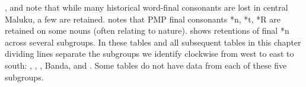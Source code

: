 \citet{Stresemann1927}, \citet{Collins1981,Collins1983}
and \citet{Blust1981} note that while many historical word-final
consonants are lost in central Maluku,
a few are retained.
\citet{Grimes2024} notes that PMP final consonants *n,
*t, *R are retained on some nouns (often relating to nature).
 shows retentions of final *n across several subgroups.
In these tables
and all subsequent tables in this chapter dividing lines separate
the subgroups we identify clockwise from west to east to south:
, , , Banda, and .
Some tables do not have data from each of these five subgroups.

